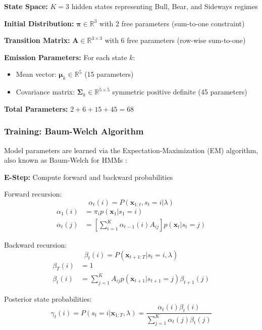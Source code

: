 \documentclass[conference]{IEEEtran}
\begin{document}
\textbf{State Space:} $K = 3$ hidden states representing Bull, Bear, and Sideways regimes

\textbf{Initial Distribution:} $\boldsymbol{\pi} \in \mathbb{R}^3$ with 2 free parameters (sum-to-one constraint)

\textbf{Transition Matrix:} $\mathbf{A} \in \mathbb{R}^{3 \times 3}$ with 6 free parameters (row-wise sum-to-one)

\textbf{Emission Parameters:} For each state $k$:
\begin{itemize}
\item Mean vector: $\boldsymbol{\mu}_k \in \mathbb{R}^5$ (15 parameters)
\item Covariance matrix: $\boldsymbol{\Sigma}_k \in \mathbb{R}^{5 \times 5}$ symmetric positive definite (45 parameters)
\end{itemize}

\textbf{Total Parameters:} $2 + 6 + 15 + 45 = 68$

\subsubsection{Training: Baum-Welch Algorithm}
Model parameters are learned via the Expectation-Maximization (EM) algorithm, also known as Baum-Welch for HMMs \cite{baum1966}:

\textbf{E-Step:} Compute forward and backward probabilities

Forward recursion:
\begin{equation}
\alpha_t(i) = P(\mathbf{x}_{1:t}, s_t=i | \lambda)
\end{equation}
\begin{align}
\alpha_1(i) &= \pi_i p(\mathbf{x}_1 | s_1=i) \\
\alpha_t(j) &= \left[\sum_{i=1}^{K}\alpha_{t-1}(i)A_{ij}\right] p(\mathbf{x}_t | s_t=j)
\end{align}

Backward recursion:
\begin{equation}
\beta_t(i) = P(\mathbf{x}_{t+1:T} | s_t=i, \lambda)
\end{equation}
\begin{align}
\beta_T(i) &= 1 \\
\beta_t(i) &= \sum_{j=1}^{K}A_{ij}p(\mathbf{x}_{t+1} | s_{t+1}=j)\beta_{t+1}(j)
\end{align}

Posterior state probabilities:
\begin{equation}
\gamma_t(i) = P(s_t=i | \mathbf{x}_{1:T}, \lambda) = \frac{\alpha_t(i)\beta_t(i)}{\sum_{j=1}^{K}\alpha_t(j)\beta_t(j)}
\end{equation}
\end{document}
